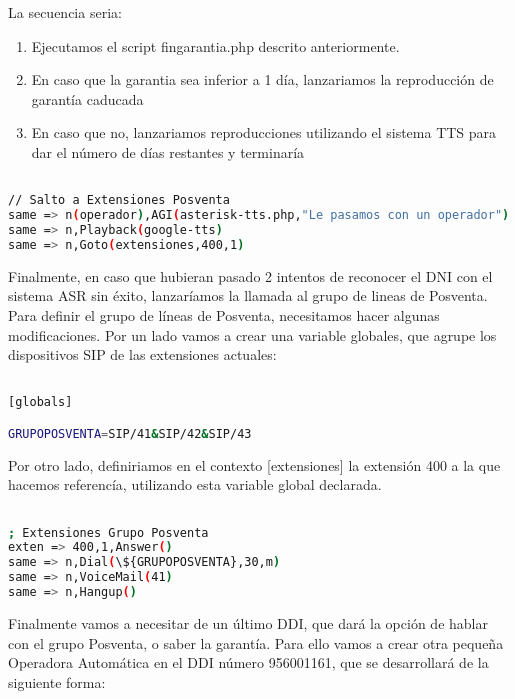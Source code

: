 La secuencia seria:

\begin{enumerate}
	\item Ejecutamos el script fingarantia.php descrito anteriormente.
	\item En caso que la garantia sea inferior a 1 día, lanzariamos la reproducción de garantía caducada
	\item En caso que no, lanzariamos reproducciones utilizando el sistema TTS para dar el número de días restantes y terminaría
\end{enumerate}


\begin{lstlisting}[language=bash,title={(/etc/asterisk/extensions.conf}]

// Salto a Extensiones Posventa
same => n(operador),AGI(asterisk-tts.php,"Le pasamos con un operador")
same => n,Playback(google-tts)
same => n,Goto(extensiones,400,1)

\end{lstlisting}

Finalmente, en caso que hubieran pasado 2 intentos de reconocer el DNI con el sistema ASR sin éxito, lanzaríamos la llamada al grupo de lineas de Posventa. Para definir el grupo de líneas de Posventa, necesitamos hacer algunas modificaciones. Por un lado vamos a crear una variable globales, que agrupe los dispositivos SIP de las extensiones actuales:

\begin{lstlisting}[language=bash,title={(/etc/asterisk/extensions.conf}]

[globals]

GRUPOPOSVENTA=SIP/41&SIP/42&SIP/43

\end{lstlisting}

Por otro lado, definiriamos en el contexto [extensiones] la extensión 400 a la que hacemos referencía, utilizando esta variable global declarada.

\begin{lstlisting}[language=bash,title={(/etc/asterisk/extensions.conf}]

; Extensiones Grupo Posventa
exten => 400,1,Answer()
same => n,Dial(\${GRUPOPOSVENTA},30,m)
same => n,VoiceMail(41)
same => n,Hangup()

\end{lstlisting}

Finalmente vamos a necesitar de un último DDI, que dará la opción de hablar con el grupo Posventa, o saber la garantía. Para ello vamos a crear otra pequeña Operadora Automática en el DDI número 956001161, que se desarrollará de la siguiente forma:

